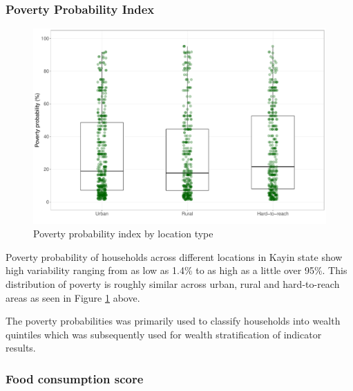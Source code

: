 \documentclass[12pt,a4paper]{article}
\begin{document}
\hypertarget{ppi-results}{%
\subsubsection{Poverty Probability Index}\label{ppi-results}}

\begin{figure}[H]

{\centering \includegraphics{kayinReport_files/figure-latex/ppiTable-1} 

}

\caption{Poverty probability index by location type}\label{fig:ppiTable}
\end{figure}

Poverty probability of households across different locations in Kayin state show high variability ranging from as low as 1.4\% to as high as a little over 95\%. This distribution of poverty is roughly similar across urban, rural and hard-to-reach areas as seen in Figure \ref{fig:ppiTable} above.

The poverty probabilities was primarily used to classify households into wealth quintiles which was subsequently used for wealth stratification of indicator results.

\hypertarget{fcs-results}{%
\subsubsection{Food consumption score}\label{fcs-results}}
\end{document}

